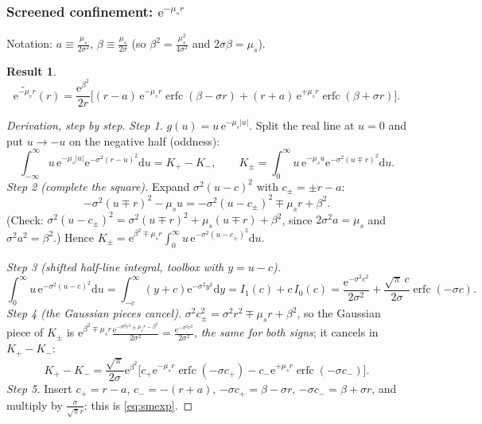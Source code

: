 \documentclass[11pt,a4paper]{article}
\numberwithin{equation}{section}
\theoremstyle{definition}
\theoremstyle{plain}
\newtheorem{result}[definition]{Result}
\theoremstyle{remark}
\numberwithin{algorithm}{section}
\newcommand{\dd}{\mathrm{d}}
\newcommand{\ee}{\mathrm{e}}
\newcommand{\erfc}{\operatorname{erfc}}
\newcommand{\mus}{\mu_s}
\begin{document}
\subsubsection{\texorpdfstring{Screened confinement: $\ee^{-\mus r}$}{Screened confinement}}\label{sec:smexp}
Notation: $a\equiv\frac{\mus}{2\sigma^2}$, $\beta\equiv\frac{\mus}{2\sigma}$ (so $\beta^2=\frac{\mus^2}{4\sigma^2}$ and $2\sigma\beta=\mus$).
\begin{result}
\begin{equation}
\widetilde{\ee^{-\mus r}}(r)=\frac{\ee^{\beta^2}}{2r}\Big[(r-a)\,\ee^{-\mus r}\erfc(\beta-\sigma r)+(r+a)\,\ee^{+\mus r}\erfc(\beta+\sigma r)\Big].
\label{eq:smexp}
\end{equation}
\end{result}
\begin{proof}[Derivation, step by step]
\emph{Step 1.} $g(u)=u\,\ee^{-\mus|u|}$. Split the real line at $u=0$ and put $u\to-u$ on the negative half (oddness):
\begin{equation*}
\int_{-\infty}^\infty u\,\ee^{-\mus|u|}\ee^{-\sigma^2(r-u)^2}\dd u=K_+-K_-,\qquad K_\pm=\int_0^\infty u\,\ee^{-\mus u}\ee^{-\sigma^2(u\mp r)^2}\dd u .
\end{equation*}
\emph{Step 2 (complete the square).} Expand $\sigma^2(u-c)^2$ with $c_\pm=\pm r-a$:
\begin{equation*}
-\sigma^2(u\mp r)^2-\mus u=-\sigma^2(u-c_\pm)^2\mp\mus r+\beta^2 .
\end{equation*}
(Check: $\sigma^2(u-c_\pm)^2=\sigma^2(u\mp r)^2+\mus(u\mp r)+\beta^2$, since $2\sigma^2a=\mus$ and $\sigma^2a^2=\beta^2$.) Hence $K_\pm=\ee^{\beta^2\mp\mus r}\int_0^\infty u\,\ee^{-\sigma^2(u-c_\pm)^2}\dd u$.

\emph{Step 3 (shifted half-line integral, toolbox with $y=u-c$).}
\begin{equation*}
\int_0^\infty u\,\ee^{-\sigma^2(u-c)^2}\dd u=\int_{-c}^\infty(y+c)\ee^{-\sigma^2y^2}\dd y=I_1(c)+c\,I_0(c)=\frac{\ee^{-\sigma^2c^2}}{2\sigma^2}+\frac{\sqrt\pi\,c}{2\sigma}\erfc(-\sigma c).
\end{equation*}
\emph{Step 4 (the Gaussian pieces cancel).} $\sigma^2c_\pm^2=\sigma^2r^2\mp\mus r+\beta^2$, so the Gaussian piece of $K_\pm$ is
$\ee^{\beta^2\mp\mus r}\frac{\ee^{-\sigma^2r^2\pm\mus r-\beta^2}}{2\sigma^2}=\frac{\ee^{-\sigma^2r^2}}{2\sigma^2}$, \emph{the same for both signs}; it cancels in $K_+-K_-$:
\begin{equation*}
K_+-K_-=\frac{\sqrt\pi}{2\sigma}\ee^{\beta^2}\Big[c_+\ee^{-\mus r}\erfc(-\sigma c_+)-c_-\ee^{+\mus r}\erfc(-\sigma c_-)\Big].
\end{equation*}
\emph{Step 5.} Insert $c_+=r-a$, $c_-=-(r+a)$, $-\sigma c_+=\beta-\sigma r$, $-\sigma c_-=\beta+\sigma r$, and multiply by $\frac{\sigma}{\sqrt\pi r}$: this is \eqref{eq:smexp}.
\end{proof}
\end{document}
